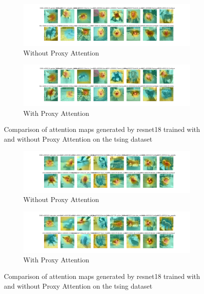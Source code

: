     \begin{figure}[H]
        \centering
        \begin{subfigure}[b]{1\textwidth}
            \includegraphics[width=\textwidth]{images/tsing_resnet18_noproxy_2.pdf}
            \caption{Without Proxy Attention}
        \end{subfigure}
        \hfill
        \begin{subfigure}[b]{1\textwidth}
            \includegraphics[width=\textwidth]{images/tsing_resnet18_proxy_2.pdf}
            \caption{With Proxy Attention}
        \end{subfigure}
        \caption{Comparison of attention maps generated by resnet18 trained with and without Proxy Attention on the tsing dataset}
    \end{figure}
    

    \begin{figure}[H]
        \centering
        \begin{subfigure}[b]{1\textwidth}
            \includegraphics[width=\textwidth]{images/tsing_resnet18_noproxy_3.pdf}
            \caption{Without Proxy Attention}
        \end{subfigure}
        \hfill
        \begin{subfigure}[b]{1\textwidth}
            \includegraphics[width=\textwidth]{images/tsing_resnet18_proxy_3.pdf}
            \caption{With Proxy Attention}
        \end{subfigure}
        \caption{Comparison of attention maps generated by resnet18 trained with and without Proxy Attention on the tsing dataset}
    \end{figure}
    
